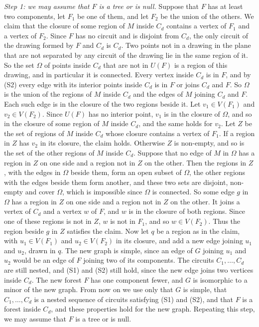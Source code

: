 {\textit{Step 1: we may assume that $F$ is a tree or is null.} Suppose that $F$ has at least two components, let $F_1$ be one of them, and let $F_2$ be the union of the others. We claim that the closure of some region of $M$ inside $C_d$ contains a vertex of $F_1$ and a vertex of $F_2$. Since $F$ has no circuit and is disjoint from $C_d$, the only circuit of the drawing formed by $F$ and $C_d$ is $C_d$. Two points not in a drawing in the plane that are not separated by any circuit of the drawing lie in the same region of it. So the set $\Omega$ of points inside $C_d$ that are not in $U(F)$ is a region of this drawing, and in particular it is connected. Every vertex inside $C_d$ is in $F$, and by (S2) every edge with its interior points inside $C_d$ is in $F$ or joins $C_d$ and $F$. So $\Omega$ is the union of the regions of $M$ inside $C_d$ and the edges of $M$ joining $C_d$ and $F$. Each such edge is in the closure of the two regions beside it. Let $v_1 \in V(F_1)$ and $v_2 \in V(F_2)$. Since $U(F)$ has no interior point, $v_1$ is in the closure of $\Omega$, and so in the closure of some region of $M$ inside $C_d$, and the same holds for $v_2$. Let $Z$ be the set of regions of $M$ inside $C_d$ whose closure contains a vertex of $F_1$. If a region in $Z$ has $v_2$ in its closure, the claim holds. Otherwise $Z$ is non-empty, and so is the set of the other regions of $M$ inside $C_d$. Suppose that no edge of $M$ in $\Omega$ has a region in $Z$ on one side and a region not in $Z$ on the other. Then the regions in $Z$, with the edges in $\Omega$ beside them, form an open subset of $\Omega$, the other regions with the edges beside them form another, and these two sets are disjoint, non-empty and cover $\Omega$, which is impossible since $\Omega$ is connected. So some edge $g$ in $\Omega$ has a region in $Z$ on one side and a region not in $Z$ on the other. It joins a vertex of $C_d$ and a vertex $w$ of $F$, and $w$ is in the closure of both regions. Since one of these regions is not in $Z$, $w$ is not in $F_1$, and so $w \in V(F_2)$. Thus the region beside $g$ in $Z$ satisfies the claim. Now let $q$ be a region as in the claim, with $u_1 \in V(F_1)$ and $u_2 \in V(F_2)$ in its closure, and add a new edge joining $u_1$ and $u_2$, drawn in $q$. The new graph is simple, since an edge of $G$ joining $u_1$ and $u_2$ would be an edge of $F$ joining two of its components. The circuits $C_1, \dots, C_d$ are still nested, and (S1) and (S2) still hold, since the new edge joins two vertices inside $C_d$. The new forest $F$ has one component fewer, and $G$ is isomorphic to a minor of the new graph. From now on we use only that $G$ is simple, that $C_1, \dots, C_d$ is a nested sequence of circuits satisfying (S1) and (S2), and that $F$ is a forest inside $C_d$, and these properties hold for the new graph. Repeating this step, we may assume that $F$ is a tree or is null.

}
